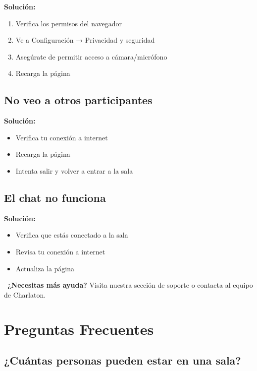 \documentclass[11pt,a4paper]{article}
\begin{document}
\textbf{Solución:}
\begin{enumerate}[leftmargin=2cm]
    \item Verifica los permisos del navegador
    \item Ve a Configuración → Privacidad y seguridad
    \item Asegúrate de permitir acceso a cámara/micrófono
    \item Recarga la página
\end{enumerate}

\subsection{No veo a otros participantes}

\textbf{Solución:}
\begin{itemize}
    \item Verifica tu conexión a internet
    \item Recarga la página
    \item Intenta salir y volver a entrar a la sala
\end{itemize}

\subsection{El chat no funciona}

\textbf{Solución:}
\begin{itemize}
    \item Verifica que estás conectado a la sala
    \item Revisa tu conexión a internet
    \item Actualiza la página
\end{itemize}

\begin{tipbox}
    \faQuestionCircle\ \textbf{¿Necesitas más ayuda?} Visita nuestra sección de soporte o contacta al equipo de Charlaton.
\end{tipbox}

\section{Preguntas Frecuentes \faQuestion}

\subsection{¿Cuántas personas pueden estar en una sala?}
\end{document}
